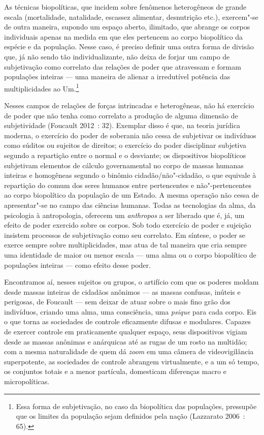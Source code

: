 As técnicas biopolíticas, que incidem sobre fenômenos heterogêneos de
grande escala (mortalidade, natalidade, escassez alimentar, desnutrição
etc.), exercem"-se de outra maneira, supondo um espaço aberto, ilimitado,
que abrange os corpos individuais apenas na medida em que eles pertencem
ao corpo biopolítico da espécie e da população. Nesse caso, é preciso
definir uma outra forma de divisão que, já não sendo tão
individualizante, não deixa de forjar um campo de subjetivação como
correlato das relações de poder que atravessam e formam populações
inteiras --- uma maneira de alienar a irredutível potência das
multiplicidades ao Um.\footnote{Essa forma de
  subjetivação, no caso da biopolítica das populações, pressupõe que os
  limites da população sejam definidos pela nação (Lazzarato 2006~: 65).}

Nesses campos de relações de forças intrincadas e heterogêneas, não há
exercício de poder que não tenha como correlato a produção de alguma
dimensão de subjetividade (Foucault 2012~: 32). Exemplar disso é que, na
teoria jurídica moderna, o exercício do poder de soberania não cessa de
subjetivar os indivíduos como súditos ou sujeitos de direitos; o
exercício do poder disciplinar subjetiva segundo a repartição entre o
normal e o desviante; os dispositivos biopolíticos subjetivam elementos
de cálculo governamental no corpo de massas humanas inteiras e
homogêneas segundo o binômio cidadão/não"-cidadão, o que equivale à
repartição do comum dos seres humanos entre pertencentes e
não"-pertencentes ao corpo biopolítico da população de um Estado. A mesma
operação não cessa de apresentar"-se no campo das ciências humanas. Todas
as tecnologias da alma, da psicologia à antropologia, oferecem um
\emph{anthropos} a ser liberado que é, já, um efeito de poder exercido
sobre os corpos. Sob todo exercício de poder e sujeição insistem
processos de subjetivação como seu correlato. Em síntese, o poder se
exerce sempre sobre multiplicidades, mas atua de tal maneira que cria
sempre uma identidade de maior ou menor escala --- uma alma ou o corpo
biopolítico de populações inteiras --- como efeito desse poder.

Encontramos aí, nesses sujeitos ou grupos, o artifício com que os
poderes moldam desde massas inteiras de cidadãos anônimos --- as massas
confusas, inúteis e perigosas, de Foucault --- sem deixar de atuar sobre
o mais fino grão dos indivíduos, criando uma alma, uma consciência, uma
\emph{psique} para cada corpo. Eis o que torna as sociedades de controle
eficazmente difusas e modulares. Capazes de exercer controle em
praticamente qualquer espaço, seus dispositivos vigiam desde as massas
anônimas e anárquicas até as rugas de um rosto na multidão; com a mesma
naturalidade de quem dá \emph{zoom} em uma câmera de videovigilância
superpotente, as sociedades de controle abrangem virtualmente, e a um só
tempo, os conjuntos totais e a menor partícula, domesticam diferenças
macro e micropolíticas.

